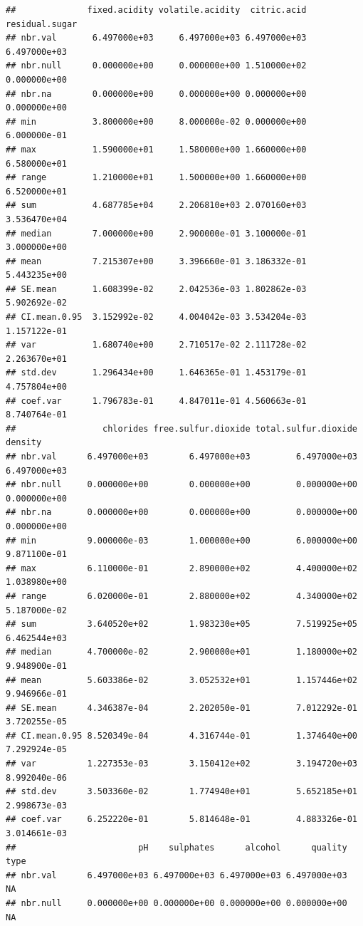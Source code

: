 \documentclass[
]{book}
\begin{document}
\begin{verbatim}
##              fixed.acidity volatile.acidity  citric.acid residual.sugar
## nbr.val       6.497000e+03     6.497000e+03 6.497000e+03   6.497000e+03
## nbr.null      0.000000e+00     0.000000e+00 1.510000e+02   0.000000e+00
## nbr.na        0.000000e+00     0.000000e+00 0.000000e+00   0.000000e+00
## min           3.800000e+00     8.000000e-02 0.000000e+00   6.000000e-01
## max           1.590000e+01     1.580000e+00 1.660000e+00   6.580000e+01
## range         1.210000e+01     1.500000e+00 1.660000e+00   6.520000e+01
## sum           4.687785e+04     2.206810e+03 2.070160e+03   3.536470e+04
## median        7.000000e+00     2.900000e-01 3.100000e-01   3.000000e+00
## mean          7.215307e+00     3.396660e-01 3.186332e-01   5.443235e+00
## SE.mean       1.608399e-02     2.042536e-03 1.802862e-03   5.902692e-02
## CI.mean.0.95  3.152992e-02     4.004042e-03 3.534204e-03   1.157122e-01
## var           1.680740e+00     2.710517e-02 2.111728e-02   2.263670e+01
## std.dev       1.296434e+00     1.646365e-01 1.453179e-01   4.757804e+00
## coef.var      1.796783e-01     4.847011e-01 4.560663e-01   8.740764e-01
##                 chlorides free.sulfur.dioxide total.sulfur.dioxide      density
## nbr.val      6.497000e+03        6.497000e+03         6.497000e+03 6.497000e+03
## nbr.null     0.000000e+00        0.000000e+00         0.000000e+00 0.000000e+00
## nbr.na       0.000000e+00        0.000000e+00         0.000000e+00 0.000000e+00
## min          9.000000e-03        1.000000e+00         6.000000e+00 9.871100e-01
## max          6.110000e-01        2.890000e+02         4.400000e+02 1.038980e+00
## range        6.020000e-01        2.880000e+02         4.340000e+02 5.187000e-02
## sum          3.640520e+02        1.983230e+05         7.519925e+05 6.462544e+03
## median       4.700000e-02        2.900000e+01         1.180000e+02 9.948900e-01
## mean         5.603386e-02        3.052532e+01         1.157446e+02 9.946966e-01
## SE.mean      4.346387e-04        2.202050e-01         7.012292e-01 3.720255e-05
## CI.mean.0.95 8.520349e-04        4.316744e-01         1.374640e+00 7.292924e-05
## var          1.227353e-03        3.150412e+02         3.194720e+03 8.992040e-06
## std.dev      3.503360e-02        1.774940e+01         5.652185e+01 2.998673e-03
## coef.var     6.252220e-01        5.814648e-01         4.883326e-01 3.014661e-03
##                        pH    sulphates      alcohol      quality type
## nbr.val      6.497000e+03 6.497000e+03 6.497000e+03 6.497000e+03   NA
## nbr.null     0.000000e+00 0.000000e+00 0.000000e+00 0.000000e+00   NA

\end{verbatim}
\end{document}
